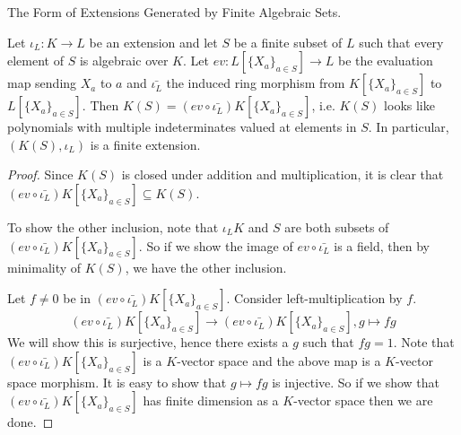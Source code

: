 \documentclass[../book.tex]{subfiles}
\begin{document}
\begin{thm} The Form of Extensions Generated by Finite Algebraic Sets. 

    Let $\iota_L : K \to L$ be an extension and let
    $S$ be a finite subset of $L$ such that 
    every element of $S$ is algebraic over $K$. 
    Let $ev : L[\{X_a\}_{a\in S}] \to L$ be the evaluation map 
    sending $X_a$ to $a$ and 
    $\bar{\iota_L}$ the induced ring morphism 
    from $K[\{X_a\}_{a\in S}]$ to $L[\{X_a\}_{a\in S}]$. 
    Then $K(S) = (ev \circ \bar{\iota_L}) K[\{X_a\}_{a\in S}]$, 
    i.e. $K(S)$ looks like polynomials with multiple indeterminates
    valued at elements in $S$. 
    In particular, $(K(S),\iota_L)$ is a finite extension.  

\end{thm}
\begin{proof}
    
    Since $K(S)$ is closed under addition and multiplication, 
    it is clear that $(ev \circ \bar{\iota_L}) K[\{X_a\}_{a\in S}] \subseteq K(S)$. 
    
    To show the other inclusion, 
    note that $\iota_L K$ and $S$ are both subsets of 
    $(ev \circ \bar{\iota_L}) K[\{X_a\}_{a\in S}]$. 
    So if we show the image of $ev \circ \bar{\iota_L}$ is a field, 
    then by minimality of $K(S)$, we have the other inclusion. 

    Let $f \neq 0$ be in $(ev \circ \bar{\iota_L}) K[\{X_a\}_{a\in S}]$.
    Consider left-multiplication by $f$. \[
        (ev \circ \bar{\iota_L}) K[\{X_a\}_{a\in S}] \to 
        (ev \circ \bar{\iota_L}) K[\{X_a\}_{a\in S}] , 
        g \mapsto f g
    \]
    We will show this is surjective, hence there exists a $g$ such that $fg = 1$. 
    Note that $(ev \circ \bar{\iota_L}) K[\{X_a\}_{a\in S}]$ is 
    a $K$-vector space and the above map is a $K$-vector space morphism. 
    It is easy to show that $g \mapsto f g$ is injective. 
    So if we show that $(ev \circ \bar{\iota_L}) K[\{X_a\}_{a\in S}]$
    has finite dimension as a $K$-vector space then we are done. 


\end{proof}
\end{document}

